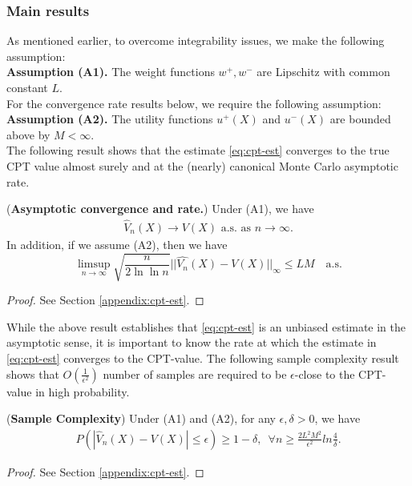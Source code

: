 \documentclass[11pt,letterpaper,english]{article}
\begin{document}
\subsubsection*{Main results}
As mentioned earlier, to overcome integrability issues, we make the following assumption:\\[1ex]
\textbf{Assumption (A1).}  The weight functions $w^+, w^-$ are Lipschitz with common constant $L$.\\[1ex]
For the convergence rate results below, we require the following assumption:\\[1ex]
\textbf{Assumption (A2).}  The utility functions $u^+(X)$ and $u^-(X)$ are bounded above by $M<\infty$.\\[1ex]
The following result shows that the estimate \eqref{eq:cpt-est} converges to the true CPT value almost surely and at the (nearly) canonical Monte Carlo asymptotic rate. 
\begin{proposition} (\textbf{Asymptotic convergence and rate.})
\label{thm:asymp-conv}
Under (A1), we have
\begin{align}
\widehat V_n(X) \rightarrow V(X) \text{ a.s. as } n \rightarrow \infty.
\end{align}
In addition, if we assume (A2), then we have
$$
\limsup_{n\rightarrow \infty} \sqrt{\frac{n}{2 \ln \ln n}} ||\hat{V_n}(X)-V(X)||_{\infty} 
\leq  LM \quad \text{a.s.}
$$
\end{proposition}
\begin{proof}
 See Section \ref{appendix:cpt-est}.
\end{proof}

While the above result establishes that \eqref{eq:cpt-est} is an unbiased estimate in the asymptotic sense, it is important to know the rate at which the estimate in \eqref{eq:cpt-est} converges to the CPT-value. 
The following sample complexity result shows that $O\left(\frac{1}{\epsilon^2}\right)$ number of samples are required to be $\epsilon$-close to the CPT-value in high probability.
\begin{proposition}(\textbf{Sample Complexity})
\label{thm:dkw}
Under (A1) and (A2), for any $\epsilon, \delta >0$, we have
\begin{align*}
P(|\widehat V_n(X) - V(X)|\le\epsilon) \geq  1 - \delta, \,\,\, \forall n \geq \frac{2 L^2 M^2}{\epsilon^2} ln \frac{4}{\delta}.
\end{align*}
\end{proposition}
\begin{proof}
 See Section \ref{appendix:cpt-est}.
\end{proof}
\end{document}
